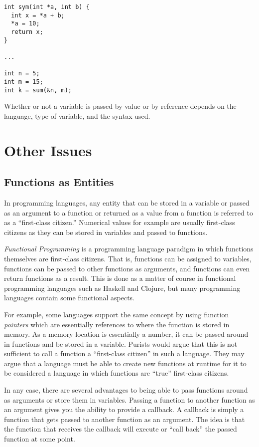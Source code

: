 \begin{verbatim}
int sym(int *a, int b) {
  int x = *a + b;
  *a = 10;
  return x;
}

...

int n = 5;
int m = 15;
int k = sum(&n, m);
\end{verbatim}



Whether or not a variable is passed by value or by reference depends
on the language, type of variable, and the syntax used.  

\section{Other Issues}

\subsection{Functions as Entities}

In programming languages, any entity that can be stored in a variable or
passed as an argument to a function or returned as a value from a function
is referred to as a ``first-class citizen.''  
Numerical values for example are
usually first-class  citizens as they can be stored in variables and passed 
to functions.

\emph{Functional Programming} 
is a programming language paradigm in
which functions themselves are first-class citizens.  That is, functions can
be assigned to variables, functions can be passed to other functions as 
arguments, and functions can even return functions as a result.  This is
done as a matter of course in functional programming languages such as
Haskell and Clojure, but many programming languages contain some 
functional aspects.

For example, some languages support the same concept by using function 
\emph{pointers} which are essentially references to where the function is stored in memory.
As a memory location is essentially a number, it can be passed around in
functions and be stored in a variable.  Purists would argue that this is
not sufficient to call a function a ``first-class citizen'' in such a language.
They may argue that a language must be able to create new functions
at runtime for it to be considered a language in which functions are 
``true'' first-class citizens.

In any case, there are several advantages to being able to pass functions
around as arguments or store them in variables.  Passing a function
to another function as an argument gives you the ability to provide a
\gls{callback}.  A  callback is simply a function that gets passed to another
function as an argument.  The idea is that the function that receives
the callback will execute or ``call back'' the passed function at some
point.

